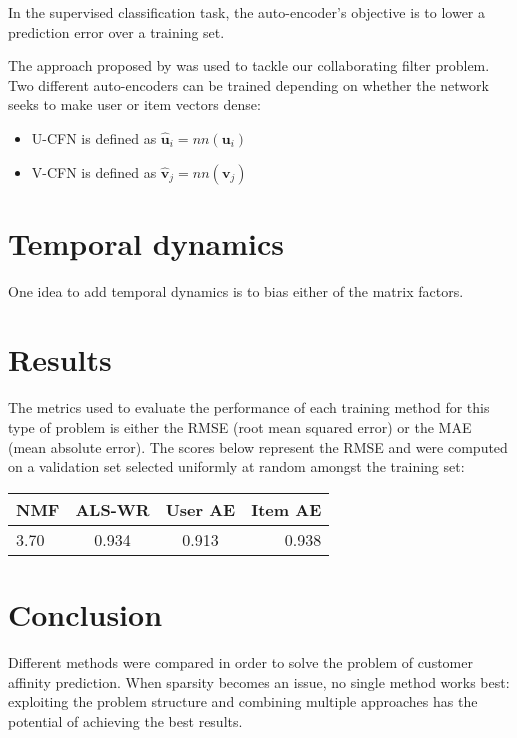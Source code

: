 \documentclass[10pt,twocolumn]{article}
\begin{document}
In the supervised classification task, the auto-encoder's objective is to lower a prediction error over a training set.

The approach proposed by \cite{strub2016hybrid} was used to tackle our collaborating filter problem. Two different auto-encoders can be trained depending on whether the network seeks to make user or item vectors dense:
\begin{itemize}
\item U-CFN is defined as $\hat{\textbf{u}}_i = nn(\textbf{u}_i)$
\item V-CFN is defined as $\hat{\textbf{v}}_j = nn(\textbf{v}_j)$ 
\end{itemize}

\section{Temporal dynamics}
One idea to add temporal dynamics is to bias either of the matrix factors.

\section{Results}
The metrics used to evaluate the performance of each training method for this type of problem is either the RMSE (root mean squared error) or the MAE (mean absolute error). The scores below represent the RMSE and were computed on a validation set selected uniformly at random amongst the training set:
\begin{tabular}{|l|c|c|r|}
  \hline
  NMF & ALS-WR & User AE & Item AE \\
  \hline
  3.70 & 0.934 & 0.913 & 0.938 \\
  \hline
\end{tabular}


\section{Conclusion}
Different methods were compared in order to solve the problem of customer affinity prediction. When sparsity becomes an issue, no single method works best: exploiting the problem structure and combining multiple approaches has the potential of achieving the best results.


\end{document}
